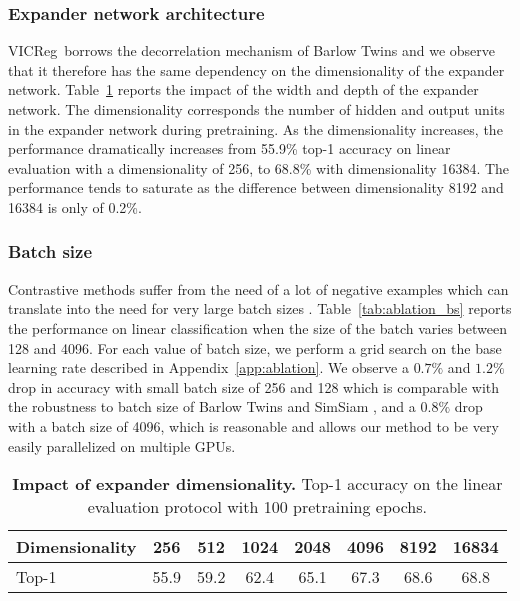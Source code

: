 \documentclass{article}
\newcommand{\algo}{VICReg}
\begin{document}
\clearpage

\subsubsection{Expander network architecture} \label{app:expander_archi}
\algo \ borrows the decorrelation mechanism of Barlow Twins \cite{zbontar2021barlow} and we observe that it therefore has the same dependency on the dimensionality of the expander network. Table~\ref{tab:ablation_expander} reports the impact of the width and depth of the expander network. The dimensionality corresponds the number of hidden and output units in the expander network during pretraining. As the dimensionality increases, the performance dramatically increases from 55.9\% top-1 accuracy on linear evaluation with a dimensionality of 256, to 68.8\% with dimensionality 16384. The performance tends to saturate as the difference between dimensionality 8192 and 16384 is only of 0.2\%.

\subsubsection{Batch size} \label{sec:batch_size} Contrastive methods suffer from the need of a lot of negative examples which can translate into the need for very large batch sizes \cite{chen2020simclr}. Table~\ref{tab:ablation_bs} reports the performance on linear classification when the size of the batch varies between 128 and 4096. For each value of batch size, we perform a grid search on the base learning rate described in Appendix~\ref{app:ablation}. We observe a $0.7\%$ and $1.2\%$ drop in accuracy with small batch size of 256 and 128 which is comparable with the robustness to batch size of Barlow Twins \cite{zbontar2021barlow} and SimSiam \cite{chen2020simsiam}, and a $0.8\%$ drop with a batch size of 4096, which is reasonable and allows our method to be very easily parallelized on multiple GPUs.

\begin{table}[t]
\caption{\textbf{Impact of expander dimensionality.} Top-1 accuracy on the linear evaluation protocol with 100 pretraining epochs.}
\label{tab:ablation_expander}
\vspace{-6mm}
\setlength{\tabcolsep}{10.5pt}
\vskip 0.15in
\begin{center}
\begin{tabular}{lccccccc}
\toprule
Dimensionality      & 256      & 512      & 1024      & 2048     & 4096  &  8192  &  16834 \\
\midrule
Top-1           & 55.9 & 59.2 & 62.4 & 65.1 & 67.3 & 68.6 & 68.8 \\
\bottomrule
\end{tabular}
\end{center}
\vspace{-2mm}
\end{table}
\end{document}
